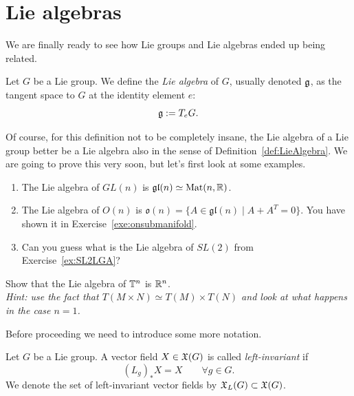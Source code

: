 \section{Lie algebras}

We are finally ready to see how Lie groups and Lie algebras ended up being related.

\begin{definition}
	Let $G$ be a Lie group.
	We define the \emph{Lie algebra} of $G$, usually denoted $\mathfrak{g}$, as the tangent space to $G$ at the identity element $e$:
	\begin{equation}
		\mathfrak{g} := T_e G.
	\end{equation}
\end{definition}

Of course, for this definition not to be completely insane, the Lie algebra of a Lie group better be a Lie algebra also in the sense of Definition~\ref{def:LieAlgebra}.
We are going to prove this very soon, but let's first look at some examples.

\begin{example}
	\begin{enumerate}
		\item The Lie algebra of $GL(n)$ is $\mathfrak{gl}(n)\simeq \mathrm{Mat}(n, \mathbb{R})$.
		\item The Lie algebra of $O(n)$ is $\mathfrak{o}(n) = \{A \in \mathfrak{gl}(n) \mid A+A^T = 0\}$. You have shown it in Exercise~\ref{exe:onsubmanifold}.
		\item Can you guess what is the Lie algebra of $SL(2)$ from Exercise~\ref{ex:SL2LGA}?
	\end{enumerate}
\end{example}

\begin{exercise}
	Show that the Lie algebra of $\mathbb{T}^n$ is $\mathbb{R}^n$.\\
	\textit{\small Hint: use the fact that $T(M\times N) \simeq T(M)\times T(N)$ and look at what happens in the case $n=1$.}
\end{exercise}

Before proceeding we need to introduce some more notation.

\begin{definition}
	Let $G$ be a Lie group.
	A vector field $X\in\mathfrak{X}(G)$ is called \emph{left-invariant} if
	\begin{equation}
		(L_g)_*X = X \qquad \forall g\in G.
	\end{equation}
	We denote the set of left-invariant vector fields by $\mathfrak{X}_L(G)\subset \mathfrak{X}(G)$.
\end{definition}


